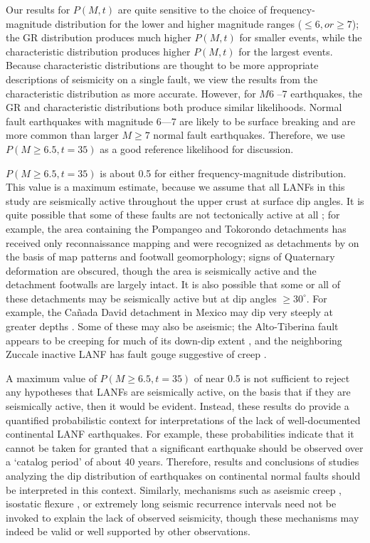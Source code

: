 \documentclass[twocolumn,grl]{AGUTeX}
\begin{document}
\begin{article}
Our results for $P(M,t)$ are quite sensitive to the choice of 
 frequency- magnitude distribution for the lower and higher magnitude ranges ($\le 6, or
\ge 7$); the GR distribution produces much higher $P(M,t)$ for smaller events,
while the characteristic distribution produces higher $P(M,t)$ for the largest
events.  Because characteristic distributions are thought to be more
appropriate descriptions of seismicity on a single fault, we view the results
from the characteristic distribution as more accurate.
However, for $M6$ --7 earthquakes, the GR and characteristic 
distributions both produce similar likelihoods. Normal fault earthquakes with magnitude 6—7 are likely to be surface breaking and are more common than larger $M \ge 7$ normal fault earthquakes.  Therefore, we use $P(M\ge6.5, t=35)$ as a good reference
likelihood for discussion.

$P(M\ge6.5, t=35)$ is about 0.5 for either frequency-magnitude distribution.
This value is a maximum estimate, because we assume that all LANFs in this
study are seismically active throughout the upper crust at surface dip angles.
It is quite possible that some of these faults are not tectonically active
at all ; for example, the area containing the Pompangeo and Tokorondo
detachments has received only reconnaissance mapping
\citep{parkinson1998sulawesi} and were recognized as detachments by
\citet{spencer2011} on the basis of map patterns and footwall geomorphology;
signs of Quaternary deformation are obscured, though the area is seismically
active and the detachment footwalls are largely intact.
It is also possible that some or all of these detachments may be seismically
active but at dip angles $\ge30^\circ$.  For example, the Ca\~nada David
detachment in Mexico may dip very steeply at greater depths 
\citep{fletcherspelz2009}.
Some of these may also be aseismic; the Alto-Tiberina fault appears to
be creeping for much of its down-dip extent
\citep{hreinsdottir2009altotib}, and the neighboring Zuccale inactive
LANF has fault gouge suggestive of creep  \citep{collettiniholdsworth2004}.

A maximum value of $P(M\ge6.5,t=35)$ of near 0.5 is not sufficient to
reject any hypotheses that LANFs are seismically active, on the basis that
if they are seismically active, then it would be evident.  Instead, these
results do provide a quantified probabilistic context for interpretations
of the lack of well-documented continental LANF earthquakes.  For example,
these probabilities indicate that it cannot be taken for granted that a
significant earthquake should be observed over a `catalog period' of
about 40 years. Therefore, results and conclusions of studies
analyzing the dip distribution of earthquakes on continental normal
faults \citep{jackson1987, collettinisibson2001} should be interpreted
in this context.  Similarly, mechanisms such as aseismic creep \citep
[e.g.,][]{collettini2011lanfmech, hreinsdottir2009altotib}, isostatic
flexure \citep[e.g.,][] {wernickeaxen1988rolling}, or extremely long
seismic recurrence intervals \citep{wernicke1995seis} need not be
invoked to explain the lack of observed seismicity, though these
mechanisms may indeed be valid or well supported by other
observations.



\end{article}
\end{document}

